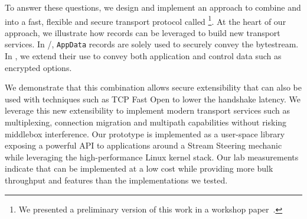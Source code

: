 To answer these questions, we design and implement an approach to combine 
\tcp and  into a fast, flexible and secure transport protocol called \textbf{\tcpls}
%
\footnote{We presented a preliminary version of this work in a workshop
  paper~\cite{rochet2020tcpls}.}.  At the heart of our approach, we illustrate
how \tls records can be leveraged to build new transport services. In \tcp/\tls,
\tls \texttt{AppData} records are solely used to securely convey the \tcp
bytestream. In \tcpls, we extend their use to convey both application and
control data such as encrypted \tcp options.

We demonstrate that this combination allows secure extensibility that can also
be used with techniques such as TCP Fast Open \cite{rfc7413} to lower the
handshake latency. We leverage this new extensibility to implement modern transport
services such as multiplexing, connection migration and multipath capabilities
without risking middlebox interference. Our \tcpls prototype is implemented as a
user-space library exposing a powerful API to applications around a Stream
Steering mechanic while leveraging the
high-performance Linux kernel \tcp stack. Our lab measurements indicate that
\tcpls can be implemented at a low cost while providing more bulk throughput and
features than the \quic implementations we tested.
 

